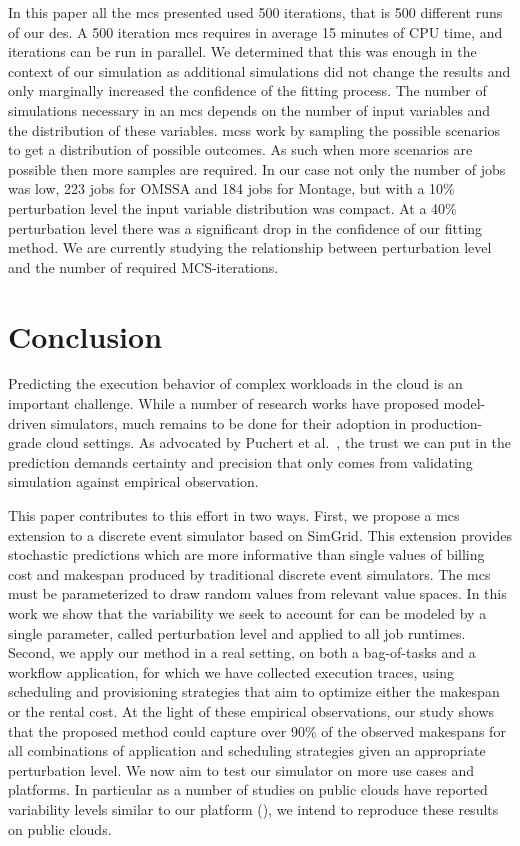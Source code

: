 \documentclass[10pt,conference,compsocconf]{IEEEtran}
\begin{document}
In this paper all the \ac{mcs} presented used 500 iterations, that is 500
different runs of our \ac{des}. A 500 iteration \ac{mcs} requires in average 15 minutes of
CPU time, and iterations can be run in  parallel. We determined that this was enough in the
context of our simulation as additional simulations did not change the results
and only marginally increased the confidence of the fitting process. The number
of simulations necessary in an \ac{mcs} depends on the number of input variables
and the distribution of these variables. \aclp{mcs} work by sampling the possible
scenarios to get a distribution of possible outcomes. As such when more scenarios are
possible then more samples are required. In our case not only the number of jobs
was low, 223 jobs for OMSSA and 184 jobs for Montage, but with a 10\%
perturbation level the input variable distribution was compact. At a 40\%
perturbation level there was a significant drop in the confidence of our fitting
method. We are currently studying the relationship between perturbation level
and the number of required MCS-iterations.

\section{Conclusion}
Predicting  the execution  behavior  of complex  workloads in  the  cloud is  an
important challenge. While a number of research works have proposed model-driven
simulators, much remains to be done for their adoption in production-grade cloud
settings. As  advocated by Puchert  et al.~\cite{PucherGWK15}, the trust  we can
put in  the prediction  demands certainty  and precision  that only  comes from
validating simulation against empirical observation.

This paper contributes to this effort in two ways. First, we propose a \acl{mcs}
extension  to a  discrete  event  simulator based  on  SimGrid.  This  extension
provides stochastic predictions which are more informative than single values of
billing cost  and makespan  produced by  traditional discrete  event simulators.
The \acl{mcs}  must be parameterized to  draw random values from  relevant value
spaces. In this work we show that the  variability we seek to account for can be
modeled  by a  single parameter,  called perturbation  level and applied  to all  job
runtimes. Second, we apply our method in  a real setting, on both a bag-of-tasks
and a workflow  application, for which we have collected  execution traces, using
scheduling and provisioning strategies that  aim to optimize either the makespan
or the  rental cost.  At  the light of  these empirical observations,  our study
shows that the proposed method could capture over 90\% of the observed makespans
for  all  combinations  of  application   and  scheduling  strategies  given  an
appropriate perturbation  level.  We now aim  to test our simulator  on more use
cases and platforms.  In particular as a number of studies on public clouds have
reported variability levels similar to our platform (\cite{LeitnerC16,pics}), we
intend to reproduce these results on public clouds.










\newpage
\end{document}
